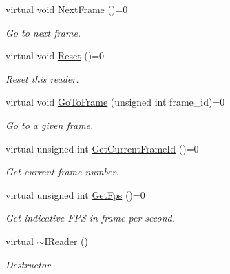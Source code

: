 \begin{DoxyCompactItemize}
virtual void \hyperlink{classmoetsi_1_1ssp_1_1IReader_a49e82a786cca55248e27e7fac8f97a17}{Next\+Frame} ()=0
\begin{DoxyCompactList}\small\item\em Go to next frame. \end{DoxyCompactList}\item 
\mbox{\label{classmoetsi_1_1ssp_1_1IReader_ad6e2ef78fc2466884aa877ecef54889d}} 
virtual void \hyperlink{classmoetsi_1_1ssp_1_1IReader_ad6e2ef78fc2466884aa877ecef54889d}{Reset} ()=0
\begin{DoxyCompactList}\small\item\em Reset this reader. \end{DoxyCompactList}\item 
virtual void \hyperlink{classmoetsi_1_1ssp_1_1IReader_a6f1be3c06538992cca6d550bd9566681}{Go\+To\+Frame} (unsigned int frame\+\_\+id)=0
\begin{DoxyCompactList}\small\item\em Go to a given frame. \end{DoxyCompactList}\item 
virtual unsigned int \hyperlink{classmoetsi_1_1ssp_1_1IReader_ac292d83eb06dee277baaa06e281a562d}{Get\+Current\+Frame\+Id} ()=0
\begin{DoxyCompactList}\small\item\em Get current frame number. \end{DoxyCompactList}\item 
virtual unsigned int \hyperlink{classmoetsi_1_1ssp_1_1IReader_a9f6a8650ca290b011b8e5451eeae9f32}{Get\+Fps} ()=0
\begin{DoxyCompactList}\small\item\em Get indicative F\+PS in frame per second. \end{DoxyCompactList}\item 
\mbox{\label{classmoetsi_1_1ssp_1_1IReader_ae1332862a7d81d99563f111ae36e142f}} 
virtual \hyperlink{classmoetsi_1_1ssp_1_1IReader_ae1332862a7d81d99563f111ae36e142f}{$\sim$\+I\+Reader} ()
\begin{DoxyCompactList}\small\item\em Destructor. \end{DoxyCompactList}\item 
\mbox{\label{classmoetsi_1_1ssp_1_1IReader_a357439182128e3911d77335c136035c0}} 

\end{DoxyCompactItemize}
